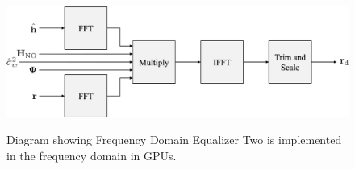 \begin{figure}
	\caption{Diagram showing Frequency Domain Equalizer Two is implemented in the frequency domain in GPUs.}
	\centering\includegraphics[width=10.03in/100*55]{figures/eq_GPUimplementation/blockFDE2.pdf}
	\label{fig:blockFDE2}
\end{figure}





